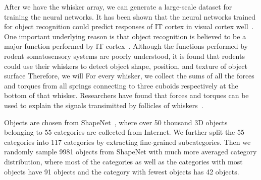 After we have the whisker array, we can generate a large-scale dataset for training the neural networks. 
It has been shown that the neural networks trained for object recognition could predict responses of IT cortex in visual cortex well~\cite{cadieu2014deep, Yamins2014}. 
One important underlying reason is that object recognition is believed to be a major function performed by IT cortex~\cite{yamins2016using}.
Although the functions performed by rodent somatosensory systems are poorly understood, it is found that rodents could use their whiskers to detect object shape, position, and texture of object surface\cite{Boubenec2012,Diamond2008,Arabzadeh2005,OConnor2010}
Therefore, we will 
For every whisker, we collect the sums of all the forces and torques from all springs connecting to three cuboids respectively at the bottom of that whisker. 
Researchers have found that forces and torques can be used to explain the signals transimitted by follicles of whiskers~\cite{Quist2014, Huet2016}.

Objects are chosen from ShapeNet~\cite{Chang2015}, where over 50 thousand 3D objects belonging to 55 categories are collected from Internet. 
We further split the 55 categories into 117 categories by extracting fine-grained subcategories. 
Then we randomly sample 9981 objects from ShapeNet with much more averaged category distribution, where most of the categories as well as the categories with most objects have 91 objects and the category with fewest objects has 42 objects. 


